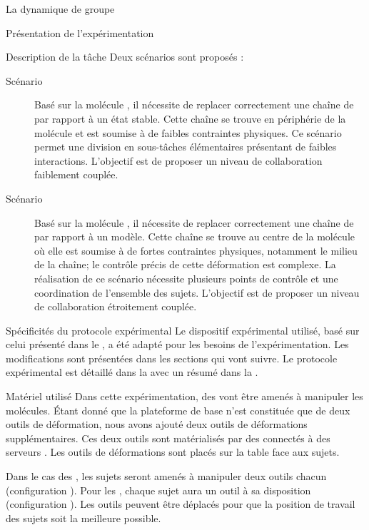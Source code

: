 \documentclass[myfrancais,ngerman,english,french]{mythesis}
\begin{document}
\begin{mychapter}{La dynamique de groupe}
\begin{mysection}{Présentation de l'expérimentation}
\begin{mysubsection}{Description de la tâche}
				Deux scénarios sont proposés :
				\begin{description}
					\item[Scénario~]
						Basé sur la molécule \myPrion, il nécessite de replacer correctement une chaîne de ~ par rapport à un état stable.
						Cette chaîne se trouve en périphérie de la molécule et est soumise à de faibles contraintes physiques.
						Ce scénario permet une division en sous-tâches élémentaires présentant de faibles interactions.
						L'objectif est de proposer un niveau de collaboration faiblement couplée.
					\item[Scénario~]
						Basé sur la molécule \myUbiquitin, il nécessite de replacer correctement une chaîne de ~ par rapport à un modèle.
						Cette chaîne se trouve au centre de la molécule où elle est soumise à de fortes contraintes physiques, notamment le milieu de la chaîne; le contrôle précis de cette déformation est complexe.
						La réalisation de ce scénario nécessite plusieurs points de contrôle et une coordination de l'ensemble des sujets.
						L'objectif est de proposer un niveau de collaboration étroitement couplée.
				\end{description}
			\end{mysubsection}
			\begin{mysubsection}{Spécificités du protocole expérimental}
				Le dispositif expérimental utilisé, basé sur celui présenté dans le , a été adapté pour les besoins de l'expérimentation.
				Les modifications sont présentées dans les sections qui vont suivre.
				Le protocole expérimental est détaillé dans la  avec un résumé dans la .
				\begin{mysubsubsection}{Matériel utilisé}
					Dans cette expérimentation, des  vont être amenés à manipuler les molécules.
					Étant donné que la plateforme de base n'est constituée que de deux outils de déformation, nous avons ajouté deux outils de déformations supplémentaires.
					Ces deux outils sont matérialisés par des \myOmni connectés à des serveurs .
					Les outils de déformations sont placés sur la table face aux sujets.

					Dans le cas des , les sujets seront amenés à manipuler deux outils chacun (configuration ).
					Pour les , chaque sujet aura un outil à sa disposition (configuration ).
					Les outils peuvent être déplacés pour que la position de travail des sujets soit la meilleure possible.


\end{mysubsubsection}
\end{mysubsection}
\end{mysection}
\end{mychapter}
\end{document}
